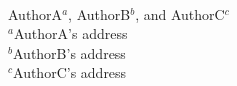 \documentclass[11pt]{article}
\begin{document}
 \begin{center}
   {\sf ~\\[14pt]
     }
 \end{center}


 \footnotesize{
   \begin{center}
     AuthorA$^a$, AuthorB$^b$, and AuthorC$^c$\\[14pt]

     $^a$AuthorA's address \\[3mm]

     $^b$AuthorB's address \\[3mm]

     $^c$AuthorC's address
   \end{center}
   }


 \normalsize
 \noindent
\end{document}
